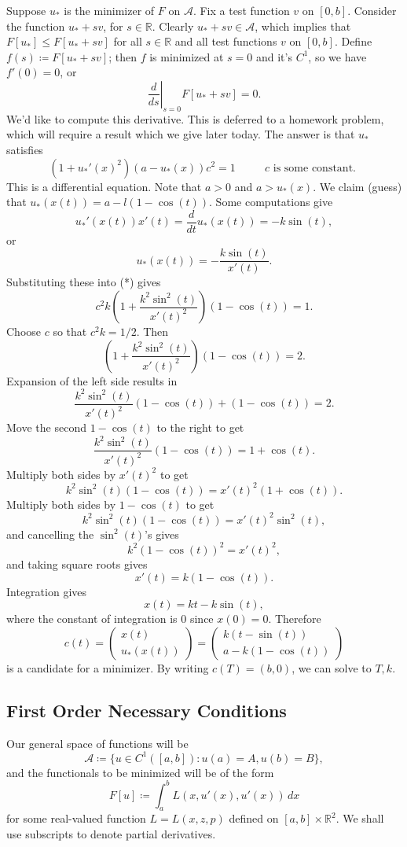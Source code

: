 \documentclass[11pt]{book}
\newcommand{\R}{\mathbb{R}}
\begin{document}
Suppose $u_*$ is the minimizer of $F$ on $\mathcal{A}$. Fix a test function $v$ on $[0,b]$. Consider the function $u_* + sv$, for $s \in \R$. Clearly $u_* + sv \in \mathcal{A}$, which implies that $F[u_*] \leq F[u_* + sv]$ for all $s \in \R$ and all test functions $v$ on $[0, b]$. Define $f(s) \coloneqq F[u_* + sv]$; then $f$ is minimized at $s = 0$ and it's $C^1$, so we have $f'(0) = 0$, or
\[
\left. \frac{d}{ds} \right|_{s = 0} F[u_* + sv] = 0.
\]
We'd like to compute this derivative. This is deferred to a homework problem, which will require a result which we give later today. The answer is that $u_*$ satisfies
\[
\tag{*}
(1 + u_*'(x)^2)(a - u_*(x))c^2 = 1 \qquad \text{ $c$ is some constant. }
\]
This is a differential equation. Note that $a > 0$ and $a > u_*(x)$. We claim (guess) that $u_*(x(t)) = a - l(1 - \cos(t))$. Some computations give
\[
u_*'(x(t))x'(t) = \frac{d}{dt} u_*(x(t)) = -k \sin(t),
\]
or
\[
u_*(x(t)) = -\frac{k\sin(t)}{x'(t)}.
\]
Substituting these into (*) gives
\[
c^2 k \left( 1 + \frac{k^2\sin^2(t)}{x'(t)^2} \right)(1 - \cos(t)) = 1.
\]
Choose $c$ so that $c^2k = 1/2$. Then
\[
\left( 1 + \frac{k^2\sin^2(t)}{x'(t)^2} \right)(1 - \cos(t)) = 2.
\]
Expansion of the left side results in
\[
\frac{k^2 \sin^2(t)}{x'(t)^2}(1 - \cos(t)) + (1 - \cos(t)) = 2.
\]
Move the second $1 - \cos(t)$ to the right to get
\[
\frac{k^2 \sin^2(t)}{x'(t)^2}(1 - \cos(t)) = 1 + \cos(t).
\]
Multiply both sides by $x'(t)^2$ to get
\[
k^2 \sin^2(t)(1 - \cos(t)) = x'(t)^2(1 + \cos(t)).
\]
Multiply both sides by $1 - \cos(t)$ to get
\[
k^2 \sin^2(t)(1 - \cos(t)) = x'(t)^2 \sin^2(t),
\]
and cancelling the $\sin^2(t)$'s gives
\[
k^2 (1 - \cos(t))^2 = x'(t)^2,
\]
and taking square roots gives
\[
x'(t) = k(1 - \cos(t)).
\]
Integration gives
\[
x(t) = kt - k\sin(t),
\]
where the constant of integration is $0$ since $x(0) = 0$. Therefore
\[
c(t) = \begin{pmatrix}
x(t) \\ u_*(x(t))
\end{pmatrix} = \begin{pmatrix}
k(t - \sin(t)) \\
a - k(1 - \cos(t))
\end{pmatrix}
\]
is a candidate for a minimizer. By writing $c(T) = (b,0)$, we can solve to $T,k$.

\subsection{First Order Necessary Conditions}

Our general space of functions will be 
\[
\mathcal{A} \coloneqq \{ u \in C^1([a,b]) : u(a) = A, u(b) = B \},
\]
and the functionals to be minimized will be of the form
\[
F[u] \coloneqq \int_a^b L(x,u'(x), u'(x)) \, dx
\]
for some real-valued function $L = L(x,z,p)$ defined on $[a,b] \times \R^2$. We shall use subscripts to denote partial derivatives.
\end{document}
